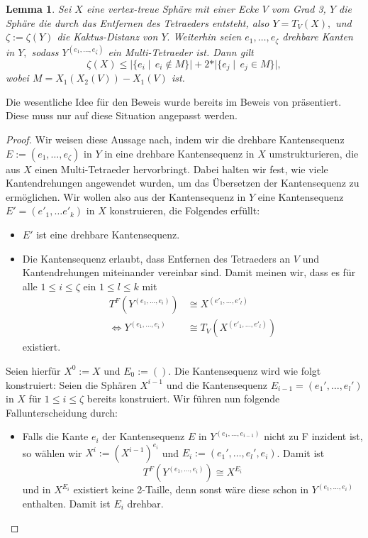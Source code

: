 \documentclass[12pt,titlepage,twoside,cleardoublepage]{article}
\theoremstyle{nummermitklammern}
\newtheorem{lemma}[temp]{Lemma}
\newtheorem{lemma}[zahl]{Lemma}
\numberwithin{equation}{section}
\begin{document}
\begin{lemma}
Sei $X$ eine vertex-treue Sphäre mit einer Ecke $V$ vom Grad 3,  $Y$ die Sphäre die durch das Entfernen des Tetraeders entsteht, also $Y=T_V(X),$ und $\zeta:=\zeta(Y)$ die Kaktus-Distanz von $Y.$ Weiterhin seien $e_1,\ldots,e_{\zeta}$ drehbare Kanten in $Y,$ sodass $Y^{(e_1,\ldots,e_{\zeta})}$ ein Multi-Tetraeder ist. Dann gilt
\[
\zeta(X)\leq \vert\{e_i\mid \, e_i \notin M\}\vert+2*\vert \{e_j\mid \, e_j \in M\}\vert,
\]
wobei $M=X_1(X_2(V))-X_1(V)$ ist.
\end{lemma}
Die wesentliche Idee für den Beweis wurde bereits im Beweis von  präsentiert. Diese muss nur auf diese Situation angepasst werden.
\begin{proof}
Wir weisen diese Aussage nach, indem wir die drehbare Kantensequenz $E:=(e_1,\ldots , e_{\zeta})$
in $Y$ in eine drehbare Kantensequenz in $X$ umstrukturieren, die aus $X$ einen
Multi-Tetraeder hervorbringt. Dabei halten wir fest, wie viele Kantendrehungen angewendet wurden, um das Übersetzen der Kantensequenz zu ermöglichen.
Wir wollen also aus der Kantensequenz in $Y$ eine Kantensequenz $E'=(e'_1,\ldots e'_k)$ in $X$ konstruieren, die Folgendes erfüllt:
\begin{itemize}
\item $E'$ ist eine drehbare Kantensequenz.
\item Die Kantensequenz erlaubt, dass Entfernen des Tetraeders an  $V$ und Kantendrehungen miteinander vereinbar sind. Damit meinen wir, dass es für alle $1\leq i\leq \zeta$ ein $1\leq l \leq k$ mit 
\begin{align*}
T^F(Y^{(e_1,\ldots, e_i)})&\cong X^{(e'_1,\ldots,e'_l)} \\
\Leftrightarrow Y^{(e_1,\ldots, e_i)}&\cong T_V(X^{(e'_1,\ldots,e'_l)})
\end{align*} 
existiert.
\end{itemize}
Seien  hierfür $X^0:=X$ und $E_0:=().$ Die Kantensequenz wird wie folgt konstruiert: Seien die Sphären $X^{i-1}$ und die Kantensequenz $E_{i-1}=(e_1',\ldots,e_l')$ in $X$ für $1\leq i \leq \zeta$ bereits konstruiert. Wir führen nun folgende Fallunterscheidung durch:
\begin{itemize}
\item Falls die Kante $e_{i}$ der Kantensequenz $E$ in $Y^{(e_1,\ldots,e_{i-1})}$ nicht zu F inzident ist, so wählen wir $X^{i}:={(X^{i-1})}^{e_i}$ und $E_{i}:=(e_1',\ldots,e_l',e_i)$. Damit ist 
\[
T^F(Y^{(e_1,\ldots,e_i)})\cong X^{E_{i}}
\]
und in $X^{E_{i}}$ existiert keine 2-Taille, denn sonst wäre diese schon in $Y^{(e_1,\ldots,e_i)}$ enthalten. Damit ist $E_{i}$ drehbar.

\end{itemize}
\end{proof}
\end{document}

